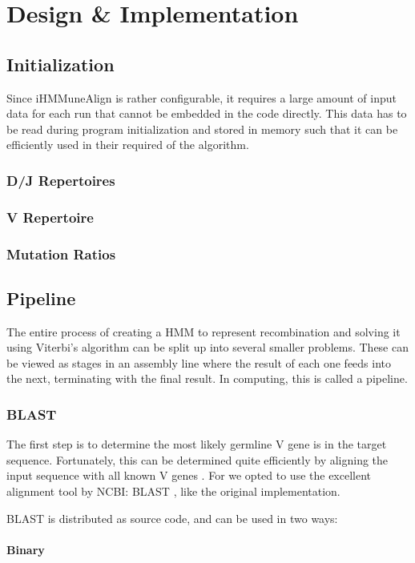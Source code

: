 \chapter{Design \& Implementation}

\section{Initialization}
Since iHMMuneAlign is rather configurable, it requires a large amount of input data for each run that cannot be embedded in the code directly. This data has to be read during program initialization and stored in memory such that it can be efficiently used in their required of the algorithm.
\subsection{D/J Repertoires}
\subsection{V Repertoire}
\subsection{Mutation Ratios}

\section{Pipeline}
The entire process of creating a HMM to represent \igh recombination and solving it using Viterbi's algorithm can be split up into several smaller problems. These can be viewed as stages in an assembly line where the result of each one feeds into the next, terminating with the final result. In computing, this is called a pipeline.

\subsection{BLAST}
The first step is to determine the most likely germline V gene is in the target sequence. Fortunately, this can be determined quite efficiently by aligning the input sequence with all known V genes \cite{IHMMuneAlign}. For we opted to use the excellent alignment tool by NCBI: BLAST \cite{blast}, like the original implementation.

BLAST is distributed as source code, and can be used in two ways:
\subsubsection{Binary}
